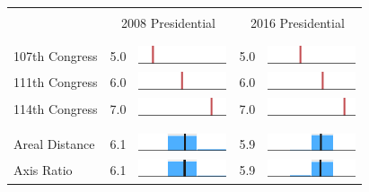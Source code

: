 
\begin{table}
\renewcommand{\arraystretch}{0.7}
 \begin{tabular}{l rm{7em} rm{7em}}
\hline \hline \\

{} & \multicolumn{2}{c}{2008 Presidential} & \multicolumn{2}{c}{2016 Presidential} \\

\\ \hline \\
107th Congress         &   5.0 &          \includegraphics[width=7em]{mini_hist/MD_2008_107} &   5.0 &          \includegraphics[width=7em]{mini_hist/MD_2016_107} \\
111th Congress         &   6.0 &          \includegraphics[width=7em]{mini_hist/MD_2008_111} &   6.0 &          \includegraphics[width=7em]{mini_hist/MD_2016_111} \\
114th Congress         &   7.0 &          \includegraphics[width=7em]{mini_hist/MD_2008_114} &   7.0 &          \includegraphics[width=7em]{mini_hist/MD_2016_114} \\
\\ \hline \\ 
Areal Distance         &   6.1 &       \includegraphics[width=7em]{mini_hist/MD_2008_dist_a} &   5.9 &       \includegraphics[width=7em]{mini_hist/MD_2016_dist_a} \\
Axis Ratio             &   6.1 &   \includegraphics[width=7em]{mini_hist/MD_2008_axis_ratio} &   5.9 &   \includegraphics[width=7em]{mini_hist/MD_2016_axis_ratio} \\

\end{tabular}
\end{table}
